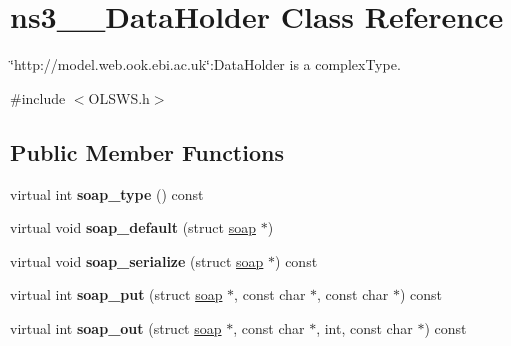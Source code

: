 \hypertarget{classns3____DataHolder}{
\section{ns3\_\-\_\-DataHolder Class Reference}
\label{classns3____DataHolder}
}


\char`\"{}http://model.web.ook.ebi.ac.uk\char`\"{}:DataHolder is a complexType.  




{\ttfamily \#include $<$OLSWS.h$>$}

\subsection*{Public Member Functions}
\begin{DoxyCompactItemize}
\item 
\hypertarget{classns3____DataHolder_a0fdda406cf4d5ce349c9164bf9579bd7}{
virtual int {\bfseries soap\_\-type} () const }
\label{classns3____DataHolder_a0fdda406cf4d5ce349c9164bf9579bd7}

\item 
\hypertarget{classns3____DataHolder_a52202d928e59cb391e4bf4a0b73cbd63}{
virtual void {\bfseries soap\_\-default} (struct \hyperlink{classns3____DataHolder_a601e3e4e48a7d8eb9f2e29a68a333563}{soap} $\ast$)}
\label{classns3____DataHolder_a52202d928e59cb391e4bf4a0b73cbd63}

\item 
\hypertarget{classns3____DataHolder_a1476515d2572ec89cef356561a6d9e6c}{
virtual void {\bfseries soap\_\-serialize} (struct \hyperlink{classns3____DataHolder_a601e3e4e48a7d8eb9f2e29a68a333563}{soap} $\ast$) const }
\label{classns3____DataHolder_a1476515d2572ec89cef356561a6d9e6c}

\item 
\hypertarget{classns3____DataHolder_a7a581e3f5947080bc03a542021f78467}{
virtual int {\bfseries soap\_\-put} (struct \hyperlink{classns3____DataHolder_a601e3e4e48a7d8eb9f2e29a68a333563}{soap} $\ast$, const char $\ast$, const char $\ast$) const }
\label{classns3____DataHolder_a7a581e3f5947080bc03a542021f78467}

\item 
\hypertarget{classns3____DataHolder_a2994da5624852e72f75df0c506410e8a}{
virtual int {\bfseries soap\_\-out} (struct \hyperlink{classns3____DataHolder_a601e3e4e48a7d8eb9f2e29a68a333563}{soap} $\ast$, const char $\ast$, int, const char $\ast$) const }
\label{classns3____DataHolder_a2994da5624852e72f75df0c506410e8a}


\end{DoxyCompactItemize}
